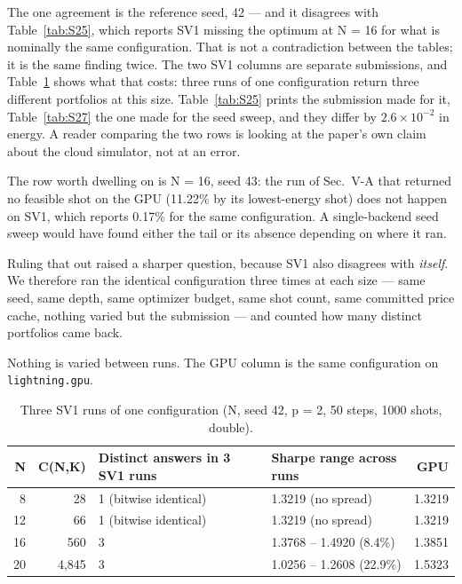 \documentclass[journal]{IEEEtran}
\begin{document}
The one agreement is the reference seed, 42 --- and it disagrees with Table~\ref{tab:S25}, which reports SV1 missing the optimum at N = 16 for what is nominally the same configuration. That is not a contradiction between the tables; it is the same finding twice. The two SV1 columns are separate submissions, and Table~\ref{tab:S28} shows what that costs: three runs of one configuration return three different portfolios at this size. Table~\ref{tab:S25} prints the submission made for it, Table~\ref{tab:S27} the one made for the seed sweep, and they differ by $2.6\times 10^{-2}$ in energy. A reader comparing the two rows is looking at the paper's own claim about the cloud simulator, not at an error.


The row worth dwelling on is N = 16, seed 43: the run of Sec.~V-A that returned no feasible shot on the GPU (11.22\% by its lowest-energy shot) does not happen on SV1, which reports 0.17\% for the same configuration. A single-backend seed sweep would have found either the tail or its absence depending on where it ran.


Ruling that out raised a sharper question, because SV1 also disagrees with \textit{itself}. We therefore ran the identical configuration three times at each size --- same seed, same depth, same optimizer budget, same shot count, same committed price cache, nothing varied but the submission --- and counted how many distinct portfolios came back.


Nothing is varied between runs. The GPU column is the same configuration on \texttt{lightning.gpu}.


\begin{table}[!t]
\centering
\scriptsize
\caption{Three SV1 runs of one configuration (N, seed 42, p = 2, 50 steps, 1000 shots, double).}
\label{tab:S28}
\begin{tabular}{rrp{}p{}r}
\toprule
N & C(N,K) & Distinct answers in 3 SV1 runs & Sharpe range across runs & GPU \\
\midrule
8 & 28 & 1 (bitwise identical) & 1.3219 (no spread) & 1.3219 \\
12 & 66 & 1 (bitwise identical) & 1.3219 (no spread) & 1.3219 \\
16 & 560 & 3 & 1.3768 -- 1.4920 (8.4\%) & 1.3851 \\
20 & 4,845 & 3 & 1.0256 -- 1.2608 (22.9\%) & 1.5323 \\
\bottomrule
\end{tabular}
\end{table}
\end{document}

